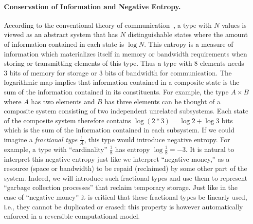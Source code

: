 \documentclass[sigplan,10pt,review,anonymous]{acmart}
\begin{document}
\paragraph*{Conservation of Information and Negative Entropy.}  
According to the conventional theory of
communication~\cite{Shannon1948}, a type with $N$ values is viewed as
an abstract system that has $N$ distinguishable states where the
amount of information contained in each state is $\log{N}$. This
entropy is a measure of information which materializes itself in
memory or bandwidth requirements when storing or transmitting elements
of this type. Thus a type with 8 elements needs 3 bits of memory for
storage or 3 bits of bandwidth for communication. The logarithmic map
implies that information contained in a composite state is the sum of
the information contained in its constituents. For example, the type
$A \times B$ where $A$ has two elements and $B$ has three elements can
be thought of a composite system consisting of two independent
unrelated subsystems.  Each state of the composite system therefore
contains $\log{(2*3)} = \log{2} + \log{3}$ bits which is the sum of
the information contained in each subsystem. If we could imagine a
\emph{fractional type} $\frac{1}{A}$, this type would introduce
negative entropy. For example, a type with ``cardinality''
$\frac{1}{8}$ has entropy $\log{\frac{1}{8}} = -3$. It is natural to
interpret this negative entropy just like we interpret ``negative
money,'' as a resource (space or bandwidth) to be repaid (reclaimed)
by some other part of the system. Indeed, we will introduce such
fractional types and use them to represent ``garbage collection
processes'' that reclaim temporary storage. Just like in the case of
``negative money'' it is critical that these fractional types be
linearly used, i.e., they cannot be duplicated or erased: this
property is however automatically enforced in a reversible
computational model.
\end{document}
